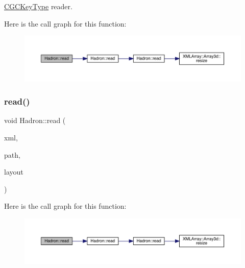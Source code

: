 \mbox{\hyperlink{structHadron_1_1CGCKeyType}{C\+G\+C\+Key\+Type}} reader. 

Here is the call graph for this function\+:
\nopagebreak
\begin{figure}[H]
\begin{center}
\leavevmode
\includegraphics[width=350pt]{d1/daf/namespaceHadron_a32f04cfa14604e9b40e037d78c0fad86_cgraph}
\end{center}
\end{figure}
\mbox{\label{namespaceHadron_a2c6adb72eb12fa49cb7c0c7d15aa4aba}} 
\subsubsection{\texorpdfstring{read()}{read()}\hspace{0.1cm}{\footnotesize\ttfamily [5/94]}}
{\footnotesize\ttfamily void Hadron\+::read (\begin{DoxyParamCaption}\item[{\mbox{\hyperlink{classADATXML_1_1XMLReader}{X\+M\+L\+Reader}} \&}]{xml,  }\item[{const std\+::string \&}]{path,  }\item[{\mbox{\hyperlink{structHadron_1_1Layout_1_1Layout__t}{Layout\+::\+Layout\+\_\+t}} \&}]{layout }\end{DoxyParamCaption})}

Here is the call graph for this function\+:
\nopagebreak
\begin{figure}[H]
\begin{center}
\leavevmode
\includegraphics[width=350pt]{d1/daf/namespaceHadron_a2c6adb72eb12fa49cb7c0c7d15aa4aba_cgraph}
\end{center}
\end{figure}
\mbox{\label{namespaceHadron_ab8d127a4d4a1ca38aae1b0d45226789e}} 

